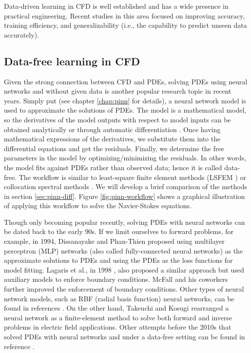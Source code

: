 Data-driven learning in CFD is well established and has a wide presence in practical engineering.
Recent studies in this area focused on improving accuracy, training efficiency, and generalizability (i.e., the capability to predict unseen data accurately).

\subsection*{Data-free learning in CFD}

Given the strong connection between CFD and PDEs, solving PDEs using neural networks and without given data is another popular research topic in recent years.
Simply put (see chapter \ref{chap:pinn} for details), a neural network model is used to approximate the solutions of PDEs.
The model is a mathematical model, so the derivatives of the model outputs with respect to model inputs can be obtained analytically or through automatic differentiation \cite{griewank_automatic_1988}.
Once having mathematical expressions of the derivatives, we substitute them into the differential equations and get the residuals. 
Finally, we determine the free parameters in the model by optimizing/minimizing the residuals.
In other words, the model fits against PDEs rather than observed data; hence it is called data-free.
The workflow is similar to least-square finite element methods (LSFEM \cite{jiang_least-squares_1998}) or collocation spectral methods \cite{trefethen_spectral_2000}.
We will develop a brief comparison of the methods in section \ref{sec:pinn-diff}.
Figure \ref{fig:pinn-workflow} shows a graphical illustration of applying this workflow to solve the Navier-Stokes equations. 

Though only becoming popular recently, solving PDEs with neural networks can be dated back to the early 90s.
If we limit ourselves to forward problems, for example, in 1994, Dissanayake and Phan-Thien \cite{dissanayake_neural-network-based_1994} proposed using multilayer perceptron (MLP) networks (also called fully-connected neural networks) as the approximate solutions to PDEs and using the PDEs as the loss functions for model fitting.
Lagaris et al., in 1998 \cite{lagaris_artificial_1998}, also proposed a similar approach but used auxiliary models to enforce boundary conditions.
McFall and his coworkers \cite{McFall2009,mcfall_solving_2010} further improved the enforcement of boundary conditions.
Other types of neural network models, such as RBF (radial basis function) neural networks, can be found in references \cite{li_numerical_2003,mai-duy_numerical_2001,demirkaya_direct_2008,li_integration_2010}.
On the other hand, Takeuchi and Kosugi \cite{takeuchi_neural_1994} rearranged a neural network as a finite-element method to solve both forward and inverse problems in electric field applications.
Other attempts before the 2010s that solved PDEs with neural networks and under a data-free setting can be found in reference \cite{yadav_introduction_2015}.

